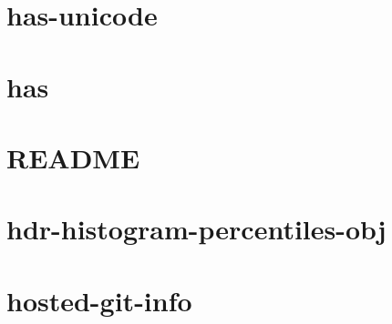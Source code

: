 \documentclass[twoside]{book}
\newcommand{\+}{\discretionary{\mbox{\scriptsize$\hookleftarrow$}}{}{}}
\begin{document}
\chapter{has-\/unicode}
\label{md__c___users_vaishnavi_jadhav__desktop__developer_code_mean_stack_example_client_node_modules_has_unicode__r_e_a_d_m_e}

\chapter{has}
\label{md__c___users_vaishnavi_jadhav__desktop__developer_code_mean_stack_example_client_node_modules_has__r_e_a_d_m_e}

\chapter{README}
\label{md__c___users_vaishnavi_jadhav__desktop__developer_code_mean_stack_example_client_node_modules_hdr_histogram_js__r_e_a_d_m_e}

\chapter{hdr-\/histogram-\/percentiles-\/obj}
\label{md__c___users_vaishnavi_jadhav__desktop__developer_code_mean_stack_example_client_node_modules_hc407ebce2ed0eaa311a46968f3fd8ff9}

\chapter{hosted-\/git-\/info}
\label{md__c___users_vaishnavi_jadhav__desktop__developer_code_mean_stack_example_client_node_modules_hosted_git_info__r_e_a_d_m_e}

\end{document}
